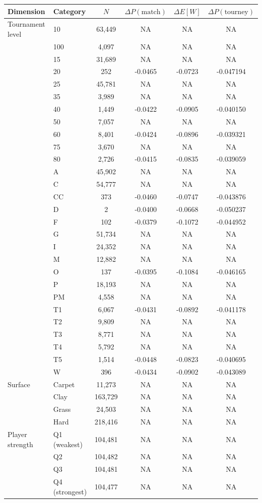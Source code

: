 \begin{tabular}{llcccc}
\toprule
Dimension & Category & $N$ & $\Delta P(\text{match})$ & $\Delta E[W]$ & $\Delta P(\text{tourney})$ \\
\midrule
Tournament level & 10 & 63,449 & NA & NA & NA \\
 & 100 & 4,097 & NA & NA & NA \\
 & 15 & 31,689 & NA & NA & NA \\
 & 20 & 252 & -0.0465 & -0.0723 & -0.047194 \\
 & 25 & 45,781 & NA & NA & NA \\
 & 35 & 3,989 & NA & NA & NA \\
 & 40 & 1,449 & -0.0422 & -0.0905 & -0.040150 \\
 & 50 & 7,057 & NA & NA & NA \\
 & 60 & 8,401 & -0.0424 & -0.0896 & -0.039321 \\
 & 75 & 3,670 & NA & NA & NA \\
 & 80 & 2,726 & -0.0415 & -0.0835 & -0.039059 \\
 & A & 45,902 & NA & NA & NA \\
 & C & 54,777 & NA & NA & NA \\
 & CC & 373 & -0.0460 & -0.0747 & -0.043876 \\
 & D & 2 & -0.0400 & -0.0668 & -0.050237 \\
 & F & 102 & -0.0379 & -0.1072 & -0.044952 \\
 & G & 51,734 & NA & NA & NA \\
 & I & 24,352 & NA & NA & NA \\
 & M & 12,882 & NA & NA & NA \\
 & O & 137 & -0.0395 & -0.1084 & -0.046165 \\
 & P & 18,193 & NA & NA & NA \\
 & PM & 4,558 & NA & NA & NA \\
 & T1 & 6,067 & -0.0431 & -0.0892 & -0.041178 \\
 & T2 & 9,809 & NA & NA & NA \\
 & T3 & 8,771 & NA & NA & NA \\
 & T4 & 5,792 & NA & NA & NA \\
 & T5 & 1,514 & -0.0448 & -0.0823 & -0.040695 \\
 & W & 396 & -0.0434 & -0.0902 & -0.043089 \\
\midrule
Surface & Carpet & 11,273 & NA & NA & NA \\
 & Clay & 163,729 & NA & NA & NA \\
 & Grass & 24,503 & NA & NA & NA \\
 & Hard & 218,416 & NA & NA & NA \\
\midrule
Player strength & Q1 (weakest) & 104,481 & NA & NA & NA \\
 & Q2 & 104,482 & NA & NA & NA \\
 & Q3 & 104,481 & NA & NA & NA \\
 & Q4 (strongest) & 104,477 & NA & NA & NA \\
\bottomrule
\end{tabular}
